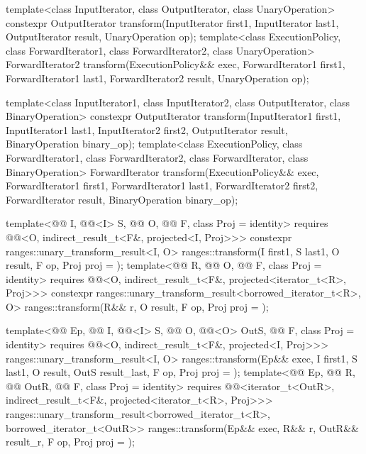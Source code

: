 %
\begin{itemdecl}
template<class InputIterator, class OutputIterator,
         class UnaryOperation>
  constexpr OutputIterator
    transform(InputIterator first1, InputIterator last1,
              OutputIterator result, UnaryOperation op);
template<class ExecutionPolicy, class ForwardIterator1, class ForwardIterator2,
         class UnaryOperation>
  ForwardIterator2
    transform(ExecutionPolicy&& exec,
              ForwardIterator1 first1, ForwardIterator1 last1,
              ForwardIterator2 result, UnaryOperation op);

template<class InputIterator1, class InputIterator2,
         class OutputIterator, class BinaryOperation>
  constexpr OutputIterator
    transform(InputIterator1 first1, InputIterator1 last1,
              InputIterator2 first2, OutputIterator result,
              BinaryOperation binary_op);
template<class ExecutionPolicy, class ForwardIterator1, class ForwardIterator2,
         class ForwardIterator, class BinaryOperation>
  ForwardIterator
    transform(ExecutionPolicy&& exec,
              ForwardIterator1 first1, ForwardIterator1 last1,
              ForwardIterator2 first2, ForwardIterator result,
              BinaryOperation binary_op);

template<@@ I, @@<I> S, @@ O,
         @@ F, class Proj = identity>
  requires @@<O, indirect_result_t<F&, projected<I, Proj>>>
  constexpr ranges::unary_transform_result<I, O>
    ranges::transform(I first1, S last1, O result, F op, Proj proj = {});
template<@@ R, @@ O, @@ F,
         class Proj = identity>
  requires @@<O, indirect_result_t<F&, projected<iterator_t<R>, Proj>>>
  constexpr ranges::unary_transform_result<borrowed_iterator_t<R>, O>
    ranges::transform(R&& r, O result, F op, Proj proj = {});

template<@@ Ep, @@ I, @@<I> S,
         @@ O, @@<O> OutS,
         @@ F, class Proj = identity>
  requires @@<O, indirect_result_t<F&, projected<I, Proj>>>
  ranges::unary_transform_result<I, O>
    ranges::transform(Ep&& exec, I first1, S last1, O result, OutS result_last,
                      F op, Proj proj = {});
template<@@ Ep, @@ R, @@ OutR,
          @@ F, class Proj = identity>
  requires @@<iterator_t<OutR>,
                                indirect_result_t<F&, projected<iterator_t<R>, Proj>>>
  ranges::unary_transform_result<borrowed_iterator_t<R>, borrowed_iterator_t<OutR>>
    ranges::transform(Ep&& exec, R&& r, OutR&& result_r, F op, Proj proj = {});


\end{itemdecl}
